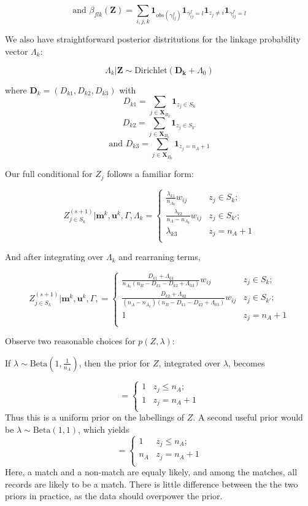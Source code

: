 \documentclass[
  12pt,
]{article}
\begin{document}
\[\text{and } \beta_{flk}(\mathbf{Z})= \sum_{i,j, k} \mathbf{1}_{obs(\gamma_{ij}^f)}\mathbf{1}_{\gamma_{ij}^f = l} \mathbf{1}_{z_j \neq i}\mathbf{1}_{\gamma_{ij}^f = l}\]

We also have straightforward posterior distritutions for the linkage
probability vector \(\Lambda_k\):

\[\Lambda_k | \mathbf{Z} \sim \text{Dirichlet}(\mathbf{D_k} + \Lambda_0)\]

where \(\mathbf{D}_k = (D_{k1}, D_{k2}, D_{k3})\) with
\[D_{k1} = \sum_{j \in \mathbf{X}_{B_k}} \mathbf{1}_{z_j \in S_k}\]
\[D_{k2} = \sum_{j \in \mathbf{X}_{B_k}} \mathbf{1}_{z_j \in S_{k'}}\]
\[\text{and } D_{k3} = \sum_{j \in \mathbf{X}_{B_k}} \mathbf{1}_{z_j = n_A + 1}\]

Our full conditional for \(Z_j\) follows a familiar form:

\[Z_{j \in S_k}^{(s+1)} | \mathbf{m}^k, \mathbf{u}^k, \Gamma, \Lambda_k =
\begin{cases} 
    \frac{\lambda_{k1}}{n_{A_k}} w_{ij} & z_j \in S_k; \\
    \frac{\lambda_{k2}}{n_A - n_{A_k}} w_{ij}  & z_j \in S_{k'}; \\
     \lambda_{k3} & z_j = n_A + 1 \\
\end{cases}\]

And after integrating over \(\Lambda_k\) and rearraning terms,

\[Z_{j \in S_k}^{(s+1)} | \mathbf{m}^k, \mathbf{u}^k, \Gamma,  =
\begin{cases} 
    \frac{D_{k1} + \Lambda_{01}}{n_{A_k}(n_B - D_{k1} - D_{k2} + \Lambda_{03})} w_{ij} & z_j \in S_k; \\
    \frac{D_{k2} + \Lambda_{02}}{(n_A - n_{A_k})(n_B - D_{k1} - D_{k2} + \Lambda_{03})} w_{ij}  & z_j \in S_{k'}; \\
     1 & z_j = n_A + 1 \\
\end{cases}\]

\newpage

Observe two reasonable choices for \(p(Z, \lambda)\):

If \(\lambda \sim \text{Beta}(1, \frac{1}{n_A})\), then the prior for
\(Z\), integrated over \(\lambda\), becomes

\[=\begin{cases} 
    1  & z_j \leq n_A; \\
    1 &  z_j  = n_A + 1 \\
\end{cases}\] Thus this is a uniform prior on the labellings of \(Z\). A
second useful prior would be \(\lambda \sim \text{Beta}(1, 1)\), which
yields \[=\begin{cases} 
    1  & z_j \leq n_A; \\
    n_A &  z_j  = n_A + 1 \\
\end{cases}\] Here, a match and a non-match are equaly likely, and among
the matches, all records are likely to be a match. There is little
difference between the the two priors in practice, as the data should
overpower the prior.
\end{document}
